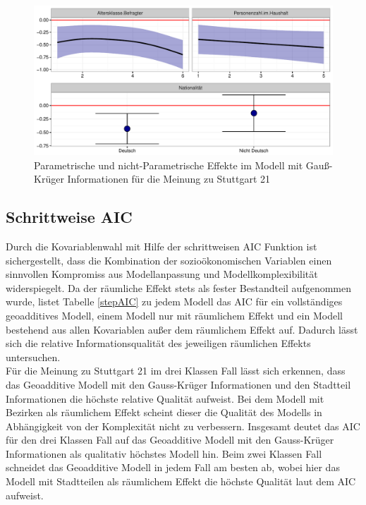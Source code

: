 \documentclass{Vorlage}
\begin{document}
\begin{figure}[h]
 \begin{center}
 \includegraphics[scale=0.8]{Pictures/BWModelEffects}
 \caption{Parametrische und nicht-Parametrische Effekte im Modell mit Gauß-Krüger Informationen für die Meinung zu Stuttgart 21}
 \label{BWParam}
 \end{center}
\end{figure}




\subsection{Schrittweise AIC}


Durch die Kovariablenwahl mit Hilfe der schrittweisen AIC Funktion ist sichergestellt, dass die Kombination der sozioökonomischen Variablen einen sinnvollen Kompromiss aus Modellanpassung und Modellkomplexibilität widerspiegelt. Da der räumliche Effekt stets als fester Bestandteil aufgenommen wurde, listet Tabelle \ref{stepAIC} zu jedem Modell das AIC für ein vollständiges geoadditives Modell, einem Modell nur mit räumlichem Effekt und ein Modell bestehend aus allen Kovariablen außer dem räumlichem Effekt auf. Dadurch lässt sich die relative Informationsqualität des jeweiligen räumlichen Effekts untersuchen. \\
Für die Meinung zu Stuttgart 21 im drei Klassen Fall lässt sich erkennen, dass das Geoadditive Modell mit den Gauss-Krüger Informationen und den Stadtteil Informationen die höchste relative Qualität aufweist. Bei dem Modell mit Bezirken als räumlichem Effekt scheint dieser die Qualität des Modells in Abhängigkeit von der Komplexität nicht zu verbessern. Insgesamt deutet das AIC für den drei Klassen Fall auf das Geoadditive Modell mit den Gauss-Krüger Informationen als qualitativ höchstes Modell hin. Beim zwei Klassen Fall schneidet das Geoadditive Modell in jedem Fall am besten ab, wobei hier das Modell mit Stadtteilen als räumlichem Effekt die höchste Qualität laut dem AIC aufweist.
\end{document}
